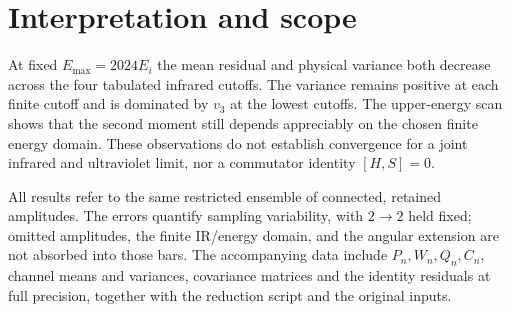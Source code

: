 \documentclass[10pt,a4paper]{article}
\begin{document}
\section{Interpretation and scope}
At fixed $E_{\max}=2024E_i$ the mean residual and physical variance
both decrease across the four tabulated infrared cutoffs. The variance
remains positive at each finite cutoff and is dominated by $v_3$ at
the lowest cutoffs. The upper-energy scan shows that the second moment
still depends appreciably on the chosen finite energy domain.
These observations do not establish convergence for a joint infrared
and ultraviolet limit, nor a commutator identity $[H,S]=0$.

All results refer to the same restricted ensemble of connected,
retained amplitudes. The errors quantify sampling variability, with
$2\to2$ held fixed; omitted amplitudes, the finite IR/energy domain,
and the angular extension are not absorbed into those bars. The
accompanying data include $P_n,W_n,Q_n,C_n$, channel means and
variances, covariance matrices and the identity residuals at full
precision, together with the reduction script and the original inputs.
\end{document}
